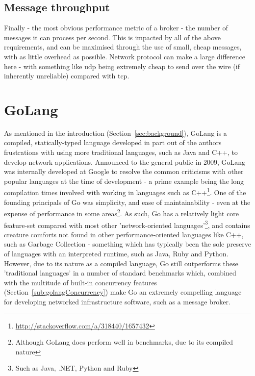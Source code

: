 \subsection{Message throughput}
\label{sub:Message throughput}

Finally - the most obvious performance metric of a broker - the number of
messages it can process per second. This is impacted by all of the above
requirements, and can be maximised through the use of small, cheap messages,
with as little overhead as possible. Network protocol can make a large
difference here - with something like \gls{udp} being extremely cheap to send over the
wire (if inherently unreliable) compared with \gls{tcp}.

\section{GoLang}
\label{sec:GoLang}

As mentioned in the introduction (Section~\ref{sec:background}), GoLang is a
compiled, statically-typed language developed in part out of the authors
frustrations with using more traditional languages, such as Java and C++, to
develop network applications\cite{kenThompsonInterview}. Announced to the
general public in 2009, GoLang was internally developed at Google to resolve the
common criticisms with other popular languages at the time of development - a
prime example being the long compilation times involved with working in
languages such as C++\footnote{\url{http://stackoverflow.com/a/318440/1657432}}.
One of the founding principals of Go was simplicity, and ease of
maintainability\cite{lessIsExponentiallyMore} - even at the expense of
performance in some areas\footnote{Although GoLang does perform well in
benchmarks, due to its compiled nature\cite{benchmarksGame}}. As such, Go has a
relatively light core feature-set compared with most other 'network-oriented
languages'\footnote{Such as Java, .NET, Python and Ruby}, and contains creature
comforts not found in other performance-oriented languages like C++, such as
Garbage Collection - something which has typically been the sole preserve of
languages with an interpreted runtime, such as Java, Ruby and Python. However,
due to its nature as a compiled language, Go still outperforms these
'traditional languages' in a number of standard benchmarks\cite{benchmarksGame}
which, combined with the multitude of built-in concurrency features
(Section~\ref{sub:golangConcurrency}) make Go an extremely compelling language
for developing networked infrastructure software, such as a message broker.

